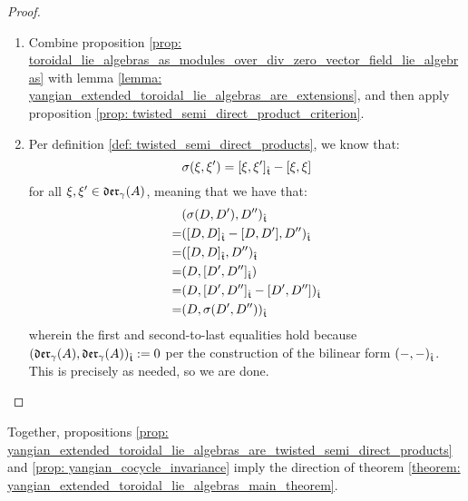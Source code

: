             \begin{proof}
                \begin{enumerate}
                    \item Combine proposition \ref{prop: toroidal_lie_algebras_as_modules_over_div_zero_vector_field_lie_algebras} with lemma \ref{lemma: yangian_extended_toroidal_lie_algebras_are_extensions}, and then apply proposition \ref{prop: twisted_semi_direct_product_criterion}.
                    \item Per definition \ref{def: twisted_semi_direct_products}, we know that:
                        $$\sigma(\xi, \xi') = [\xi, \xi']_{\hat{\mathfrak{t}}} - [\xi, \xi]$$
                    for all $\xi, \xi' \in \mathfrak{der}_{\gamma}(A)$, meaning that we have that:
                        $$
                            \begin{aligned}
                                & (\sigma(D, D'), D'')_{\hat{\mathfrak{t}}}
                                \\
                                = & ([D, D]_{\hat{\mathfrak{t}}} - [D, D'], D'')_{\hat{\mathfrak{t}}}
                                \\
                                = & ([D, D]_{\hat{\mathfrak{t}}}, D'')_{\hat{\mathfrak{t}}} 
                                \\
                                = & (D, [D', D'']_{\hat{\mathfrak{t}}})
                                \\
                                = & (D, [D', D'']_{\hat{\mathfrak{t}}} - [D', D''])_{\hat{\mathfrak{t}}}
                                \\
                                = & (D, \sigma(D', D''))_{\hat{\mathfrak{t}}}
                            \end{aligned}
                        $$
                    wherein the first and second-to-last equalities hold because $(\mathfrak{der}_{\gamma}(A), \mathfrak{der}_{\gamma}(A))_{\hat{\mathfrak{t}}} := 0$ per the construction of the bilinear form $(-, -)_{\hat{\mathfrak{t}}}$. This is precisely as needed, so we are done.
                \end{enumerate}
            \end{proof}

        Together, propositions \ref{prop: yangian_extended_toroidal_lie_algebras_are_twisted_semi_direct_products} and \ref{prop: yangian_cocycle_invariance} imply the  direction of theorem \ref{theorem: yangian_extended_toroidal_lie_algebras_main_theorem}.